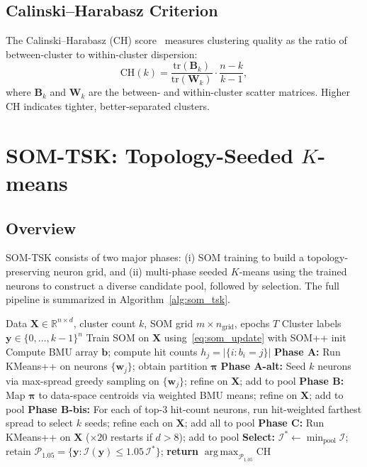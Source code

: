 \documentclass[journal]{IEEEtran}
\DeclareMathOperator*{\argmax}{arg\,max}
\begin{document}
\subsection{Calinski--Harabasz Criterion}

The Calinski--Harabasz (CH) score~\cite{calinski1974dendrite} measures clustering quality as the ratio of between-cluster to within-cluster dispersion:
\begin{equation}
  \mathrm{CH}(k) = \frac{\mathrm{tr}(\mathbf{B}_k)}{\mathrm{tr}(\mathbf{W}_k)} \cdot \frac{n - k}{k - 1},
  \label{eq:ch}
\end{equation}
where $\mathbf{B}_k$ and $\mathbf{W}_k$ are the between- and within-cluster scatter matrices. Higher CH indicates tighter, better-separated clusters.

\section{SOM-TSK: Topology-Seeded $K$-means}
\label{sec:som_tsk}

\subsection{Overview}

SOM-TSK consists of two major phases: (i) SOM training to build a topology-preserving neuron grid, and (ii) multi-phase seeded $K$-means using the trained neurons to construct a diverse candidate pool, followed by selection. The full pipeline is summarized in Algorithm~\ref{alg:som_tsk}.

\begin{algorithm}
\caption{SOM-TSK: Topology-Seeded $K$-means}
\label{alg:som_tsk}
\begin{algorithmic}[1]
\Require Data $\mathbf{X} \in \mathbb{R}^{n \times d}$, cluster count $k$, SOM grid $m \times n_{\text{grid}}$, epochs $T$
\Ensure  Cluster labels $\mathbf{y} \in \{0,\ldots,k-1\}^n$
\State Train SOM on $\mathbf{X}$ using~\eqref{eq:som_update} with SOM++ init
\State Compute BMU array $\mathbf{b}$; compute hit counts $h_j = |\{i : b_i = j\}|$
\State \textbf{Phase A:} Run KMeans++ on neurons $\{\mathbf{w}_j\}$; obtain partition $\boldsymbol{\pi}$
\State \textbf{Phase A-alt:} Seed $k$ neurons via max-spread greedy sampling on $\{\mathbf{w}_j\}$; refine on $\mathbf{X}$; add to pool
\State \textbf{Phase B:} Map $\boldsymbol{\pi}$ to data-space centroids via weighted BMU means; refine on $\mathbf{X}$; add to pool
\State \textbf{Phase B-bis:} For each of top-3 hit-count neurons, run hit-weighted farthest spread to select $k$ seeds; refine each on $\mathbf{X}$; add all to pool
\State \textbf{Phase C:} Run KMeans++ on $\mathbf{X}$ ($\times 20$ restarts if $d > 8$); add to pool
\State \textbf{Select:} $\mathcal{I}^* \leftarrow \min_{\text{pool}} \mathcal{I}$;\; retain $\mathcal{P}_{1.05} = \{\mathbf{y} : \mathcal{I}(\mathbf{y}) \le 1.05\,\mathcal{I}^*\}$;\; \textbf{return} $\argmax_{\mathcal{P}_{1.05}} \mathrm{CH}$
\end{algorithmic}
\end{algorithm}
\end{document}

